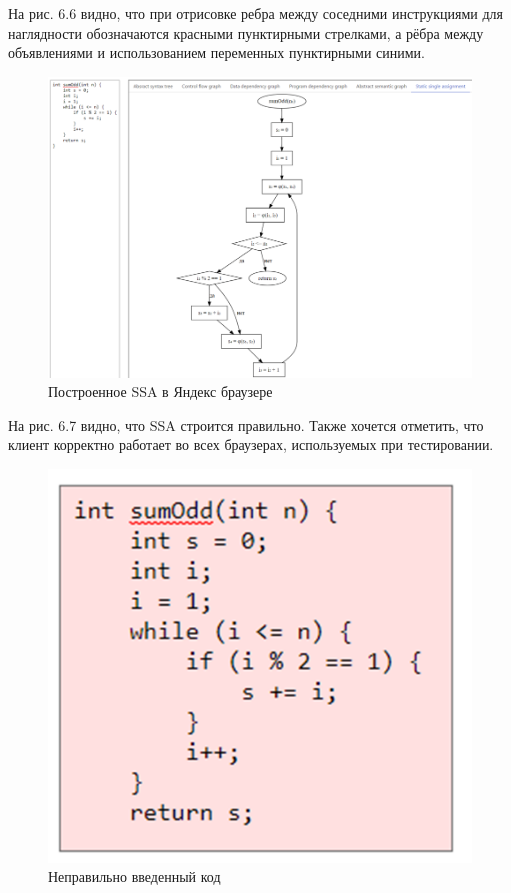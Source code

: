 На рис. 6.6 видно, что при отрисовке ребра между соседними инструкциями для наглядности обозначаются красными пунктирными стрелками, а рёбра между объявлениями и использованием переменных пунктирными синими.

\begin{figure}[h]
	\center
	\includegraphics [scale=0.5] {my_folder/images/my/26}
	\caption{Построенное SSA в Яндекс браузере}
	\label{fig:26}
\end{figure}

На рис. 6.7 видно, что SSA строится правильно. Также хочется отметить, что клиент корректно работает во всех браузерах, используемых при тестировании.

\begin{figure}[h]
	\center
	\includegraphics [scale=0.5] {my_folder/images/my/27}
	\caption{Неправильно введенный код}
	\label{fig:27}
\end{figure}

